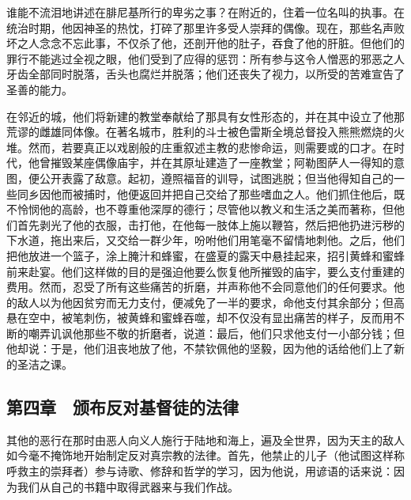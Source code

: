 谁能不流泪地讲述在腓尼基所行的卑劣之事？在附近的，住着一位名叫的执事。在统治时期，他因神圣的热忱，打碎了那里许多受人崇拜的偶像。现在，那些名声败坏之人念念不忘此事，不仅杀了他，还剖开他的肚子，吞食了他的肝脏。但他们的罪行不能逃过全视之眼，他们受到了应得的惩罚：所有参与这令人憎恶的邪恶之人牙齿全部同时脱落，舌头也腐烂并脱落；他们还丧失了视力，以所受的苦难宣告了圣善的能力。\par

在邻近的城，他们将新建的教堂奉献给了那具有女性形态的，并在其中设立了他那荒谬的雌雄同体像。在著名城市，胜利的斗士被色雷斯全境总督投入熊熊燃烧的火堆。然而，若要真正以戏剧般的庄重叙述主教的悲惨命运，则需要或的口才。在时代，他曾摧毁某座偶像庙宇，并在其原址建造了一座教堂；阿勒图萨人一得知的意图，便公开表露了敌意。起初，遵照福音的训导，试图逃脱；但当他得知自己的一些同乡因他而被捕时，他便返回并把自己交给了那些嗜血之人。他们抓住他后，既不怜悯他的高龄，也不尊重他深厚的德行；尽管他以教义和生活之美而著称，但他们首先剥光了他的衣服，击打他，在他每一肢体上施以鞭笞，然后把他扔进污秽的下水道，拖出来后，又交给一群少年，吩咐他们用笔毫不留情地刺他。之后，他们把他放进一个篮子，涂上腌汁和蜂蜜，在盛夏的露天中悬挂起来，招引黄蜂和蜜蜂前来赴宴。他们这样做的目的是强迫他要么恢复他所摧毁的庙宇，要么支付重建的费用。然而，忍受了所有这些痛苦的折磨，并声称他不会同意他们的任何要求。他的敌人以为他因贫穷而无力支付，便减免了一半的要求，命他支付其余部分；但高悬在空中，被笔刺伤，被黄蜂和蜜蜂吞噬，却不仅没有显出痛苦的样子，反而用不断的嘲弄讥讽他那些不敬的折磨者，说道：最后，他们只求他支付一小部分钱；但他却说：于是，他们沮丧地放了他，不禁钦佩他的坚毅，因为他的话给他们上了新的圣洁之课。\par


\subsection{第四章　颁布反对基督徒的法律}

其他的恶行在那时由恶人向义人施行于陆地和海上，遍及全世界，因为天主的敌人如今毫不掩饰地开始制定反对真宗教的法律。首先，他禁止的儿子（他试图这样称呼救主的崇拜者）参与诗歌、修辞和哲学的学习，因为他说，用谚语的话来说：因为我们从自己的书籍中取得武器来与我们作战。\par

